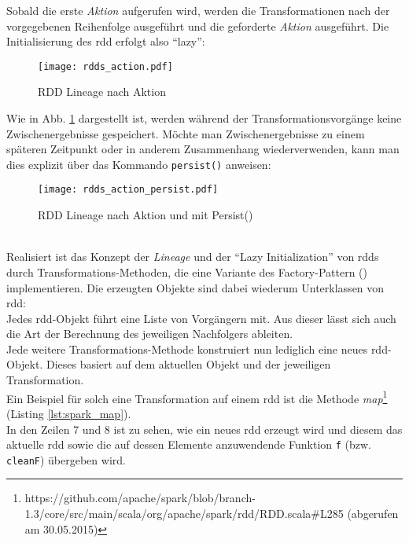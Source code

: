 Sobald die erste \textit{Aktion} aufgerufen wird, werden die Transformationen nach der vorgegebenen Reihenfolge ausgeführt und die geforderte \textit{Aktion} ausgeführt. Die Initialisierung des \gls{rdd} erfolgt also "`lazy"':\\

\begin{figure}[ht!]
	\centering
  \texttt{[image: rdds\_action.pdf]}
	\caption{RDD Lineage nach Aktion}
	\label{fig:rdds_action}
\end{figure}

Wie in Abb. \ref{fig:rdds_action} dargestellt ist, werden während der Transformationsvorgänge keine Zwischenergebnisse gespeichert. Möchte man Zwischenergebnisse zu einem späteren Zeitpunkt oder in anderem Zusammenhang wiederverwenden, kann man dies explizit über das Kommando \lstinline|persist()| anweisen:\\

\begin{figure}[ht!]
	\centering
  \texttt{[image: rdds\_action\_persist.pdf]}
	\caption{RDD Lineage nach Aktion und mit Persist()}
	\label{fig:rdds_action_persist}
\end{figure}
\\
Realisiert ist das Konzept der \textit{Lineage} und der "`Lazy Initialization"' von \glspl{rdd} durch Transformations-Methoden, die eine Variante des Factory-Pattern (\cite{FPP13}) implementieren. Die erzeugten Objekte sind dabei wiederum Unterklassen von \gls{rdd}:\\
Jedes \gls{rdd}-Objekt führt eine Liste von Vorgängern mit. Aus dieser lässt sich auch die Art der Berechnung des jeweiligen Nachfolgers ableiten.\\

Jede weitere Transformations-Methode konstruiert nun lediglich eine neues \gls{rdd}-Objekt. Dieses basiert auf dem aktuellen Objekt und der jeweiligen Transformation.\\

Ein Beispiel für solch eine Transformation auf einem \gls{rdd} ist die Methode \textit{map}\footnote{https://github.com/apache/spark/blob/branch-1.3/core/src/main/scala/org/apache/spark/rdd/RDD.scala#L285 (abgerufen am 30.05.2015)} (Listing \ref{lst:spark_map}).\\

In den Zeilen 7 und 8 ist zu sehen, wie ein neues \gls{rdd} erzeugt wird und diesem das aktuelle \gls{rdd} sowie die auf dessen Elemente anzuwendende Funktion \lstinline|f| (bzw. \lstinline|cleanF|) übergeben wird.\\

